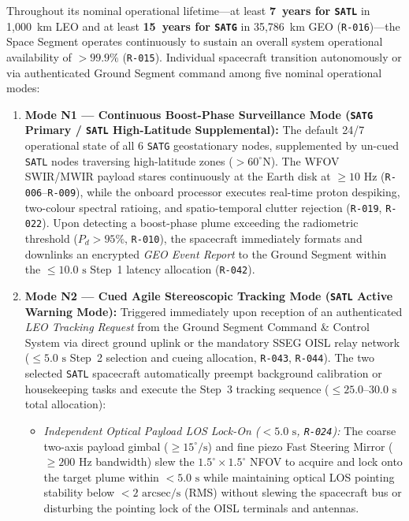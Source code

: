 \documentclass[11pt,a4paper]{article}
\providecommand{\abbr}[1]{#1}
\begin{document}
Throughout its nominal operational lifetime---at least \textbf{7~years for \texttt{SATL}} in 1,000~km \abbr{LEO} and at least \textbf{15~years for \texttt{SATG}} in 35,786~km \abbr{GEO} (\texttt{R-016})---the Space Segment operates continuously to sustain an overall system operational availability of $> 99.9\%$ (\texttt{R-015}). Individual spacecraft transition autonomously or via authenticated Ground Segment command among five nominal operational modes:
\begin{enumerate}
    \item \textbf{Mode N1 --- Continuous Boost-Phase Surveillance Mode (\texttt{SATG} Primary / \texttt{SATL} High-Latitude Supplemental):} The default 24/7 operational state of all 6 \texttt{SATG} geostationary nodes, supplemented by un-cued \texttt{SATL} nodes traversing high-latitude zones ($> 60^\circ\text{N}$). The \abbr{WFOV} \abbr{SWIR}/\abbr{MWIR} payload stares continuously at the Earth disk at $\ge 10\text{ Hz}$ (\texttt{R-006}--\texttt{R-009}), while the onboard processor executes real-time proton despiking, two-colour spectral ratioing, and spatio-temporal clutter rejection (\texttt{R-019}, \texttt{R-022}). Upon detecting a boost-phase plume exceeding the radiometric threshold ($P_d > 95\%$, \texttt{R-010}), the spacecraft immediately formats and downlinks an encrypted \emph{GEO Event Report} to the Ground Segment within the $\le 10.0\text{ s}$ Step~1 latency allocation (\texttt{R-042}).
    \item \textbf{Mode N2 --- Cued Agile Stereoscopic Tracking Mode (\texttt{SATL} Active Warning Mode):} Triggered immediately upon reception of an authenticated \emph{LEO Tracking Request} from the Ground Segment Command \& Control System via direct ground uplink or the mandatory \abbr{SSEG} \abbr{OISL} relay network ($\le 5.0\text{ s}$ Step~2 selection and cueing allocation, \texttt{R-043}, \texttt{R-044}). The two selected \texttt{SATL} spacecraft automatically preempt background calibration or housekeeping tasks and execute the Step~3 tracking sequence ($\le 25.0\text{--}30.0\text{ s}$ total allocation):
    \begin{itemize}
        \item \emph{Independent Optical Payload \abbr{LOS} Lock-On ($< 5.0\text{ s}$, \texttt{R-024}):} The coarse two-axis payload gimbal ($\ge 15^\circ/\text{s}$) and fine piezo Fast Steering Mirror ($\ge 200\text{ Hz}$ bandwidth) slew the $1.5^\circ \times 1.5^\circ$ \abbr{NFOV} to acquire and lock onto the target plume within $< 5.0\text{ s}$ while maintaining optical \abbr{LOS} pointing stability below $< 2\text{ arcsec/s}$ (RMS) without slewing the spacecraft bus or disturbing the pointing lock of the \abbr{OISL} terminals and antennas.

\end{itemize}
\end{enumerate}
\end{document}
